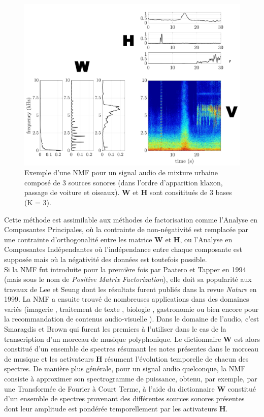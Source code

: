 \begin{figure}[t]
\centering
\includegraphics[width=.5\textwidth]{./figures/NMF/schema_introduction_nmf.pdf}
\caption{Exemple d'une NMF pour un signal audio de mixture urbaine composé de 3 sources sonores (dans l'ordre d'apparition klaxon, passage de voiture et oiseaux). $\mathbf{W}$ et $\mathbf{H}$ sont consititués de 3 bases (K = 3).}
\label{fig:ex_NMF}
\end{figure}


Cette méthode est assimilable aux méthodes de factorisation comme l'Analyse en Composantes Principales, où la contrainte de non-négativité est remplacée par une contrainte d'orthogonalité entre les matrice $\mathbf{W}$ et $\mathbf{H}$, ou l'Analyse en Composantes Indépendantes où l'indépendance entre chaque composante est supposée mais où la négativité des données est toutefois possible. \\


Si la NMF fut introduite pour la première fois par Paatero et Tapper \cite{paatero_positive_1994} en 1994 (mais sous le nom de \textit{Positive Matrix Factorization}), elle doit sa popularité aux travaux de Lee et Seung \cite{lee_learning_1999} dont les résultats furent publiés dans la revue \textit{Nature} en 1999. La NMF a ensuite trouvé de nombreuses applications dans des domaines variés 
(imagerie \cite{guillamet_introducing_2003} \cite{monga_robust_2007}, traitement de texte \cite{xu_document_2003} \cite{berry_email_2005}, biologie \cite{gao_improving_2005} \cite{chen_constrained_nodate}, gastronomie \cite{hawkins_clustering_2006} ou bien encore pour la recommandation de contenus audio-visuelle \cite{luo2014efficient}). Dans le domaine de l'audio, c'est Smaragdis et Brown \cite{smaragdis_non-negative_2003} qui furent les premiers à l'utiliser dans le cas de la transcription d'un morceau de musique polyphonique. Le dictionnaire $\mathbf{W}$ est alors constitué d'un ensemble de spectres résumant les notes présentes dans le morceau de musique et les activateurs $\mathbf{H}$ résument l'évolution temporelle de chacun des spectres. De manière plus générale, pour un signal audio quelconque, la NMF consiste à approximer son spectrogramme de puissance, obtenu, par exemple, par une Transformée de Fourier à Court Terme, à l'aide du dictionnaire $\textbf{W}$ constitué d'un ensemble de spectres provenant des différentes sources sonores présentes dont leur amplitude est pondérée temporellement par les activateurs $\textbf{H}$. 

